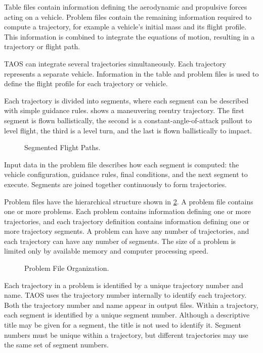 Table files contain information defining the aerodynamic and propulsive forces acting
on a vehicle. Problem files contain the remaining information required to compute a
trajectory, for example a vehicle's initial mass and its flight profile. This
information is combined to integrate the equations of motion, resulting in a
trajectory or flight path.

TAOS can integrate several trajectories simultaneously. Each trajectory represents a
separate vehicle. Information in the table and problem files is used to define the
flight profile for each trajectory or vehicle.

Each trajectory is divided into segments, where each segment can be described with
simple guidance rules. 
 shows a maneuvering reentry trajectory. The first
segment is flown ballistically, the second is a constant-angle-of-attack pullout to
level flight, the third is a level turn, and the last is flown ballistically to impact.

\begin{figure}[htbp]
  \centering
  
  \caption{Segmented Flight Paths.}
  \label{fig:segmented-flight-paths}
\end{figure}

Input data in the problem file describes how each segment is computed: the vehicle
configuration, guidance rules, final conditions, and the next segment to execute.
Segments are joined together continuously to form trajectories.

Problem files have the hierarchical structure shown in
\cref{fig:problem-file-organization}. A problem file contains one or more problems.
Each problem contains information defining one or more trajectories, and each
trajectory definition contains information defining one or more trajectory segments.
A problem can have any number of trajectories, and each trajectory can have any
number of segments. The size of a problem is limited only by available memory and
computer processing speed.

\begin{figure}[htbp]
  \centering
  \resizebox{0.96\linewidth}{!}{}
  \caption{Problem File Organization.}
  \label{fig:problem-file-organization}
\end{figure}

Each trajectory in a problem is identified by a unique trajectory number and name.
TAOS uses the trajectory number internally to identify each trajectory. Both the
trajectory number and name appear in output files. Within a trajectory, each segment
is identified by a unique segment number. Although a descriptive title may be given
for a segment, the title is not used to identify it. Segment numbers must be unique
within a trajectory, but different trajectories may use the same set of segment
numbers.

